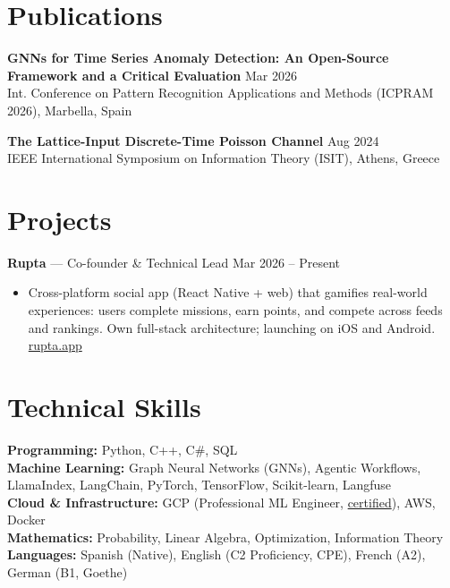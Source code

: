 \documentclass[10pt, letterpaper]{article}
\newenvironment{highlights}{
\begin{itemize}[topsep=0.06cm,itemsep=0pt,parsep=0pt,leftmargin=0.5cm]
}{
\end{itemize}
}
\begin{document}
\section{Publications}

\textbf{GNNs for Time Series Anomaly Detection: An Open-Source Framework and a Critical Evaluation} \hfill Mar 2026 \\
Int. Conference on Pattern Recognition Applications and Methods (ICPRAM 2026), Marbella, Spain

\vspace{0.09cm}

\textbf{The Lattice-Input Discrete-Time Poisson Channel} \hfill Aug 2024 \\
IEEE International Symposium on Information Theory (ISIT), Athens, Greece

\section{Projects}

\textbf{Rupta} — Co-founder \& Technical Lead \hfill Mar 2026 -- Present
\begin{highlights}
\item Cross-platform social app (React Native + web) that gamifies real-world experiences: users complete missions, earn points, and compete across feeds and rankings. Own full-stack architecture; launching on iOS and Android. \href{https://rupta.app}{rupta.app}
\end{highlights}

\section{Technical Skills}

\textbf{Programming:} Python, C++, C\#, SQL \\
\textbf{Machine Learning:} Graph Neural Networks (GNNs), Agentic Workflows, LlamaIndex, LangChain, PyTorch, TensorFlow, Scikit-learn, Langfuse \\
\textbf{Cloud \& Infrastructure:} GCP (Professional ML Engineer, \href{https://www.credly.com/badges/ed72d036-9d20-4cc5-b7ad-ccc792c15a64/public_url}{certified}), AWS, Docker \\
\textbf{Mathematics:} Probability, Linear Algebra, Optimization, Information Theory \\
\textbf{Languages:} Spanish (Native), English (C2 Proficiency, CPE), French (A2), German (B1, Goethe)
\end{document}
